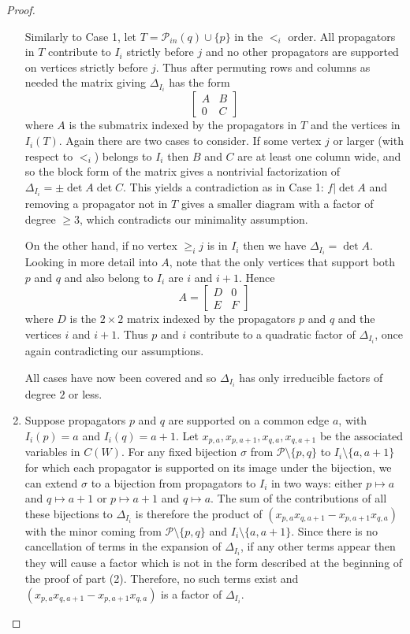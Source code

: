 \documentclass[11pt]{article}
\newcommand{\cP}{\mathcal{P}}
\theoremstyle{remark}
\theoremstyle{definition}
\begin{document}
\begin{proof}
\begin{enumerate}
Similarly to Case 1, let $T = \cP_{in}(q) \cup \{p\}$ in the $<_i$ order. All propagators in $T$ contribute to $I_i$ strictly before $j$ and no other propagators are supported on vertices strictly before $j$.  Thus after permuting rows and columns as needed the matrix giving $\Delta_{I_i}$ has the form 
\[
\begin{bmatrix} A & B \\ 0 & C\end{bmatrix}
\]
where $A$ is the submatrix indexed by the propagators in $T$ and the vertices in $I_i(T)$. Again there are two cases to consider.  If some vertex $j$ or larger (with respect to $<_i$) belongs to $I_i$ then $B$ and $C$ are at least one column wide, and so the block form of the matrix gives a nontrivial factorization of $\Delta_{I_i}=\pm\det A\det C$.  This yields a contradiction as in Case 1: $f|\det A$ and removing a propagator not in $T$ gives a smaller diagram with a factor of degree $\geq 3$, which contradicts our minimality assumption.

On the other hand, if no vertex $\geq_i j$ is in $I_i$ then we have $\Delta_{I_i} = \det A$.  Looking in more detail into $A$, note that the only vertices that support both $p$ and $q$ and also belong to $I_i$ are $i$ and $i+1$. Hence
\[
A = \begin{bmatrix} D & 0 \\ E & F\end{bmatrix}
\]
where $D$ is the $2\times 2$ matrix indexed by the propagators $p$ and $q$ and the vertices $i$ and $i+1$.  Thus $p$ and $i$ contribute to a quadratic factor of $\Delta_{I_i}$, once again contradicting our assumptions.

All cases have now been covered and so $\Delta_{I_i}$ has only irreducible factors of degree $2$ or less.

\item Suppose propagators $p$ and $q$ are supported on a common edge  $a$, with $I_i(p)=a$ and ${I_i(q)=a+1}$.  Let $x_{p,a},x_{p,a+1},x_{q,a},x_{q,a+1}$ be the associated variables in $C(W)$. For any fixed bijection $\sigma$ from $\cP\setminus\{p,q\}$ to $I_i \setminus\{a,a+1\}$ for which each propagator is supported on its image under the bijection, we can extend $\sigma$ to a bijection from propagators to $I_i$ in two ways: either $p\mapsto a$ and $q\mapsto a+1$ or $p\mapsto a+1$ and $q\mapsto a$.  The sum of the contributions of all these bijections to $\Delta_{I_i}$ is therefore the product of $(x_{p,a}x_{q,a+1}-x_{p,a+1}x_{q,a})$  with the minor coming from $\cP\setminus\{p, q\}$ and $I_i \setminus \{a,a+1\}$.  Since there is no cancellation of terms in the expansion of $\Delta_{I_i}$, if any other terms appear then they will cause a factor which is not in the form described at the beginning of the proof of part (2).  Therefore, no such terms exist and $(x_{p,a}x_{q,a+1}-x_{p,a+1}x_{q,a})$ is a factor of $\Delta_{I_i}$. 


\end{enumerate}
\end{proof}
\end{document}
